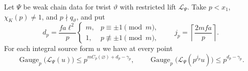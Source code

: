 \begin{lemma}
\label{lem:a-weak-chain-unmarked-valuation}
\emitthmsource
Let $\Psi$ be weak chain data for twist $\vartheta$ with restricted lift $\mathcal L_\Psi$. Take $p<x_1$, $\chi_K(p)\ne1$, and $p\nmid q_\vartheta$, and put
\[
 d_p=\frac{fa\ell^2}{p}
  \begin{cases}
   m,&p\equiv\pm1\pmod m,\\
   1,&p\not\equiv\pm1\pmod m,
  \end{cases}
 \qquad j_p=\left\lceil\frac{2mfa}{p}\right\rceil .
\]
For each integral source form $u$ we have at every point
\[
 \operatorname{Gauge}_p\bigl(\mathcal L_\Psi(u)\bigr)
 \le p^{m C_p(\varnothing)+d_p-\gamma_p},
 \qquad
 \operatorname{Gauge}_p\bigl(\mathcal L_\Psi(p^{j_p}u)\bigr)
 \le p^{d_p-\gamma_p}.
\]
\end{lemma}
